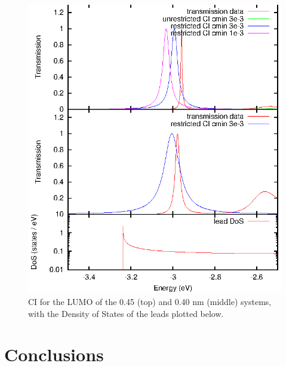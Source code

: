 \begin{figure}
	\begin{center}
		\includegraphics[width=0.9\linewidth]{figures/cilumo.eps}
	\end{center}
	\caption{CI for the \ac{LUMO} of the 0.45 (top) and 0.40 nm (middle)
                 systems, with the Density of States of the leads plotted
                 below.}
	\label{fig:cilumo}
\end{figure}

\section{Conclusions}

\label{sec:conclusions}

